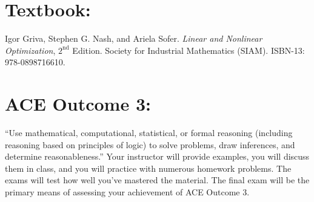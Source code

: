 \documentclass[margin]{res}
\theoremstyle{plain}
\theoremstyle{definition}
\theoremstyle{remark}
\begin{document}
\begin{resume}
 
 

\section{Textbook:} Igor Griva, Stephen G. Nash, and Ariela Sofer.  \textit{Linear and Nonlinear Optimization}, $2^{\text{nd}}$ Edition. Society for Industrial Mathematics (SIAM). ISBN-13: 978-0898716610.


% 

\section{ACE Outcome 3:}``Use mathematical, computational, statistical, or formal reasoning (including reasoning based on principles of logic) to solve problems, draw inferences, and determine reasonableness.'' Your instructor will provide examples, you will discuss them in class, and you will practice with numerous homework problems. The exams will test how well you've mastered the material.  The final exam will be the primary means of assessing your achievement of ACE Outcome 3.


\end{resume}
\end{document}
